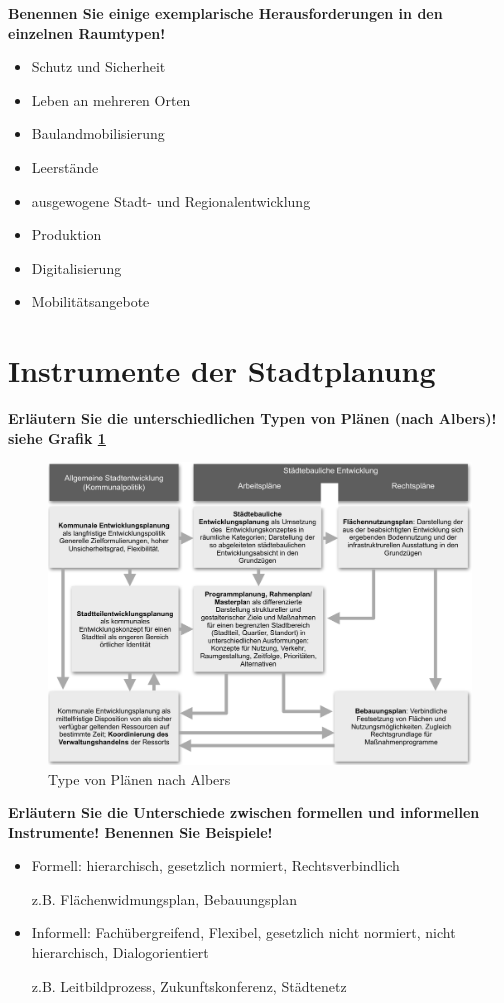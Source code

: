 \documentclass[]{article}
\newenvironment{question}{\vspace{8mm}\noindent\bfseries}{\\}
\begin{document}
\begin{question}
	Benennen Sie einige exemplarische Herausforderungen in den einzelnen Raumtypen!
\end{question}
\begin{itemize}
	\item Schutz und Sicherheit
	\item Leben an mehreren Orten
	\item Baulandmobilisierung
	\item Leerstände
	\item ausgewogene Stadt- und Regionalentwicklung
	\item Produktion
	\item Digitalisierung
	\item Mobilitätsangebote
\end{itemize}


\section{Instrumente der Stadtplanung}
\begin{question}
	Erläutern Sie die unterschiedlichen Typen von Plänen (nach Albers)!
\end{question}
siehe Grafik \ref{fig:typenvonplaenen}

\begin{figure}
	\centering
	\includegraphics[width=0.7\linewidth]{images/typen_von_plaenen}
	\caption{Type von Plänen nach Albers}
	\label{fig:typenvonplaenen}
\end{figure}



\begin{question}
	Erläutern Sie die Unterschiede zwischen formellen und informellen Instrumente! Benennen Sie Beispiele!
\end{question}

\begin{itemize}
	\item Formell: hierarchisch, gesetzlich normiert, Rechtsverbindlich
	
	z.B. Flächenwidmungsplan, Bebauungsplan
	
	\item Informell: Fachübergreifend, Flexibel, gesetzlich nicht normiert, nicht hierarchisch, Dialogorientiert
	
	z.B. Leitbildprozess, Zukunftskonferenz, Städtenetz
\end{itemize}
\end{document}
